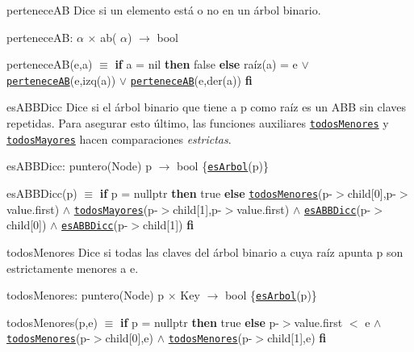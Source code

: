 \begin{DoxyParagraph}{pertenece\-A\-B}
Dice si un elemento está o no en un árbol binario.

pertenece\-A\-B\-:  $\alpha$ $\times$ ab( $\alpha$) $\to$ bool \par
pertenece\-A\-B(e,a) $\equiv$ {\bfseries if} a = nil {\bfseries then} false {\bfseries else} raíz(a) = e $\lor$ \href{axiomas.html#perteneceAB}{\tt pertenece\-A\-B}(e,izq(a)) $\lor$ \href{axiomas.html#perteneceAB}{\tt pertenece\-A\-B}(e,der(a)) {\bfseries fi} 


\end{DoxyParagraph}
\begin{DoxyParagraph}{es\-A\-B\-B\-Dicc}
Dice si el árbol binario que tiene a p como raíz es un A\-B\-B sin claves repetidas. Para asegurar esto último, las funciones auxiliares \href{axiomas.html#todosMenores}{\tt todos\-Menores} y \href{axiomas.html#todosMayores}{\tt todos\-Mayores} hacen comparaciones {\itshape estrictas}.

es\-A\-B\-B\-Dicc\-: puntero(\-Node) p $\to$ bool \{\href{axiomas.html#esArbol}{\tt es\-Arbol}(p)\} \par
es\-A\-B\-B\-Dicc(p) $\equiv$ {\bfseries if} p = nullptr {\bfseries then} true {\bfseries else} \href{axiomas.html#todosMenores}{\tt todos\-Menores}(p-\/$>$child\mbox{[}0\mbox{]},p-\/$>$value.\-first) $\land$ \href{axiomas.html#todosMayores}{\tt todos\-Mayores}(p-\/$>$child\mbox{[}1\mbox{]},p-\/$>$value.\-first) $\land$ \href{axiomas.html#esABBDicc}{\tt es\-A\-B\-B\-Dicc}(p-\/$>$child\mbox{[}0\mbox{]}) $\land$ \href{axiomas.html#esABBDicc}{\tt es\-A\-B\-B\-Dicc}(p-\/$>$child\mbox{[}1\mbox{]}) {\bfseries fi} 


\end{DoxyParagraph}
\begin{DoxyParagraph}{todos\-Menores}
Dice si todas las claves del árbol binario a cuya raíz apunta p son estrictamente menores a e.

todos\-Menores\-: puntero(\-Node) p $\times$ Key $\to$ bool \{\href{axiomas.html#esArbol}{\tt es\-Arbol}(p)\} \par
todos\-Menores(p,e) $\equiv$ {\bfseries if} p = nullptr {\bfseries then} true {\bfseries else} p-\/$>$value.\-first $<$ e $\land$ \href{axiomas.html#todosMenores}{\tt todos\-Menores}(p-\/$>$child\mbox{[}0\mbox{]},e) $\land$ \href{axiomas.html#todosMenores}{\tt todos\-Menores}(p-\/$>$child\mbox{[}1\mbox{]},e) {\bfseries fi} 


\end{DoxyParagraph}
